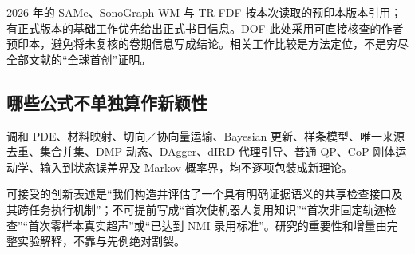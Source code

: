 \documentclass[UTF8,11pt,a4paper,fontset=fandol]{ctexart}
\numberwithin{equation}{section}
\theoremstyle{definition}
\begin{document}
2026 年的 SAMe、SonoGraph-WM 与 TR-FDF 按本次读取的预印本版本引用；有正式版本的基础工作优先给出正式书目信息。DOF 此处采用可直接核查的作者预印本，避免将未复核的卷期信息写成结论。相关工作比较是方法定位，不是穷尽全部文献的“全球首创”证明。

\subsection{哪些公式不单独算作新颖性}
调和 PDE、材料映射、切向／协向量运输、Bayesian 更新、样条模型、唯一来源去重、集合并集、DMP 动态、DAgger、dIRD 代理引导、普通 QP、CoP 刚体运动学、输入到状态误差界及 Markov 概率界，均不逐项包装成新理论。

可接受的创新表述是“我们构造并评估了一个具有明确证据语义的共享检查接口及其跨任务执行机制”；不可提前写成“首次使机器人复用知识”“首次非固定轨迹检查”“首次零样本真实超声”或“已达到 NMI 录用标准”。研究的重要性和增量由完整实验解释，不靠与先例绝对割裂。
\end{document}
